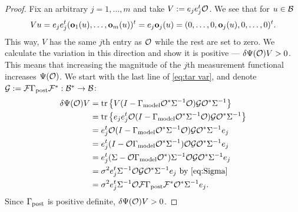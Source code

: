 \documentclass{amsart}
\numberwithin{equation}{section}
\begin{document}
\biggerbetter
\begin{proof} 
  Fix an arbitrary $j=1,\dots,m$ and take $V:= e_j e_j^t \mathcal{O}$. We see
  that for $u \in \mathcal{B}$
  \begin{equation*}
    Vu = e_je_j^t (\mathbf{o}_1(u),\dots,\mathbf{o}_m(u) )^t = e_j \mathbf{o}_j(u)
    = (0,\dots,0,\mathbf{o}_j(u),0,\dots,0)^t.
  \end{equation*}
  This way, $V$ has the same $j$th entry as $\mathcal{O}$ while the rest are
  set to zero. We calculate the variation in this direction and show
  it is positive --- $\delta \Psi(\mathcal{O})V > 0$. This means that
  increasing the magnitude of the $j$th measurement functional
  increases $\Psi(\mathcal{O})$. We start with the last line of \eqref{eq:tar
    var}, and denote $\mathcal{G} : = \mathcal{F} \Gamma_{\textup{post}} \mathcal{F}^*: \mathcal{B}^* \to \mathcal{B}$:
  \begin{align*}
     \delta \Psi(\mathcal{O}) V 
    &= \textup{tr}\left \{V ( I - \Gamma_{\textup{model}} \mathcal{O}^*\Sigma^{-1}\mathcal{O}) \mathcal{G} \mathcal{O}^* \Sigma^{-1} \right \} \\
    &= \textup{tr}\left \{e_je_j^t \mathcal{O} ( I - \Gamma_{\textup{model}} \mathcal{O}^*\Sigma^{-1}\mathcal{O}) \mathcal{G} \mathcal{O}^* \Sigma^{-1} \right \} \\
    &= e_j^t \mathcal{O} ( I - \Gamma_{\textup{model}} \mathcal{O}^*\Sigma^{-1}\mathcal{O}) \mathcal{G} \mathcal{O}^* \Sigma^{-1}e_j \\
    &= e_j^t ( I - \mathcal{O} \Gamma_{\textup{model}} \mathcal{O}^*\Sigma^{-1})\mathcal{O} \mathcal{G} \mathcal{O}^* \Sigma^{-1}e_j \\  
    &=  e_j^t(\Sigma-\mathcal{O} \Gamma_{\textup{model}} \mathcal{O}^*) \Sigma^{-1}\mathcal{O} \mathcal{G} \mathcal{O}^* \Sigma^{-1}e_j \\
    &=\sigma^2 e_j^t \Sigma^{-1}\mathcal{O} \mathcal{G} \mathcal{O}^* \Sigma^{-1}e_j
    \text{ by \eqref{eq:Sigma} }\\
    &=\sigma^2 e_j^t \Sigma^{-1}\mathcal{O} \mathcal{F} \Gamma_{\textup{post}} \mathcal{F}^* \mathcal{O}^* \Sigma^{-1}e_j.
  \end{align*} 
  Since $\Gamma_{\textup{post}}$ is positive definite, $\delta \Psi(\mathcal{O}) V > 0$.
\end{proof}
\end{document}
